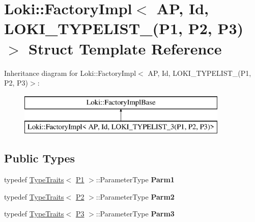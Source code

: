 \hypertarget{structLoki_1_1FactoryImpl_3_01AP_00_01Id_00_01LOKI__TYPELIST__3_07P1_00_01P2_00_01P3_08_4}{}\section{Loki\+:\+:Factory\+Impl$<$ A\+P, Id, L\+O\+K\+I\+\_\+\+T\+Y\+P\+E\+L\+I\+S\+T\+\_(P1, P2, P3)$>$ Struct Template Reference}
\label{structLoki_1_1FactoryImpl_3_01AP_00_01Id_00_01LOKI__TYPELIST__3_07P1_00_01P2_00_01P3_08_4}
Inheritance diagram for Loki\+:\+:Factory\+Impl$<$ A\+P, Id, L\+O\+K\+I\+\_\+\+T\+Y\+P\+E\+L\+I\+S\+T\+\_(P1, P2, P3)$>$\+:\begin{figure}[H]
\begin{center}
\leavevmode
\includegraphics[height=2.000000cm]{structLoki_1_1FactoryImpl_3_01AP_00_01Id_00_01LOKI__TYPELIST__3_07P1_00_01P2_00_01P3_08_4}
\end{center}
\end{figure}
\subsection*{Public Types}
\begin{DoxyCompactItemize}
\item 
\hypertarget{structLoki_1_1FactoryImpl_3_01AP_00_01Id_00_01LOKI__TYPELIST__3_07P1_00_01P2_00_01P3_08_4_a80ee379b50f6bb04950b97e63b2f5931}{}typedef \hyperlink{classLoki_1_1TypeTraits}{Type\+Traits}$<$ \hyperlink{structP1}{P1} $>$\+::Parameter\+Type {\bfseries Parm1}\label{structLoki_1_1FactoryImpl_3_01AP_00_01Id_00_01LOKI__TYPELIST__3_07P1_00_01P2_00_01P3_08_4_a80ee379b50f6bb04950b97e63b2f5931}

\item 
\hypertarget{structLoki_1_1FactoryImpl_3_01AP_00_01Id_00_01LOKI__TYPELIST__3_07P1_00_01P2_00_01P3_08_4_a35e2b24c72b9a2209ce740d0ff4552dc}{}typedef \hyperlink{classLoki_1_1TypeTraits}{Type\+Traits}$<$ \hyperlink{structP2}{P2} $>$\+::Parameter\+Type {\bfseries Parm2}\label{structLoki_1_1FactoryImpl_3_01AP_00_01Id_00_01LOKI__TYPELIST__3_07P1_00_01P2_00_01P3_08_4_a35e2b24c72b9a2209ce740d0ff4552dc}

\item 
\hypertarget{structLoki_1_1FactoryImpl_3_01AP_00_01Id_00_01LOKI__TYPELIST__3_07P1_00_01P2_00_01P3_08_4_a5fee2f628cecc19a3c61cdcf8cbfa85a}{}typedef \hyperlink{classLoki_1_1TypeTraits}{Type\+Traits}$<$ \hyperlink{structP3}{P3} $>$\+::Parameter\+Type {\bfseries Parm3}\label{structLoki_1_1FactoryImpl_3_01AP_00_01Id_00_01LOKI__TYPELIST__3_07P1_00_01P2_00_01P3_08_4_a5fee2f628cecc19a3c61cdcf8cbfa85a}

\end{DoxyCompactItemize}
